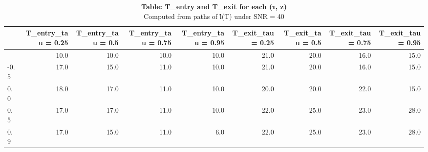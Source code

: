 \begin{table}[t]
\caption*{
{\fontsize{10}{13}\selectfont  \textbf{Table: T\_entry and T\_exit for each (τ, z)}\small } \\ 
{\fontsize{8}{10}\selectfont  Computed from paths of l̂(T) under SNR = 40\small }
} 
\begin{tabular*}{\linewidth}{@{\extracolsep{\fill}}l|rrrrrrrr}
\toprule
 & T\_entry\_tau = 0.25 & T\_entry\_tau = 0.5 & T\_entry\_tau = 0.75 & T\_entry\_tau = 0.95 & T\_exit\_tau = 0.25 & T\_exit\_tau = 0.5 & T\_exit\_tau = 0.75 & T\_exit\_tau = 0.95 \\ 
\midrule\addlinespace[2.5pt]
-0.9 & 10.0 & 10.0 & 10.0 & 10.0 & 21.0 & 20.0 & 16.0 & 15.0 \\ 
-0.5 & 17.0 & 15.0 & 11.0 & 10.0 & 21.0 & 20.0 & 16.0 & 15.0 \\ 
0.0 & 18.0 & 17.0 & 11.0 & 10.0 & 20.0 & 20.0 & 22.0 & 15.0 \\ 
0.5 & 17.0 & 17.0 & 11.0 & 10.0 & 22.0 & 25.0 & 23.0 & 28.0 \\ 
0.9 & 17.0 & 15.0 & 11.0 & 6.0 & 22.0 & 25.0 & 23.0 & 28.0 \\ 
\bottomrule
\end{tabular*}
\end{table}
